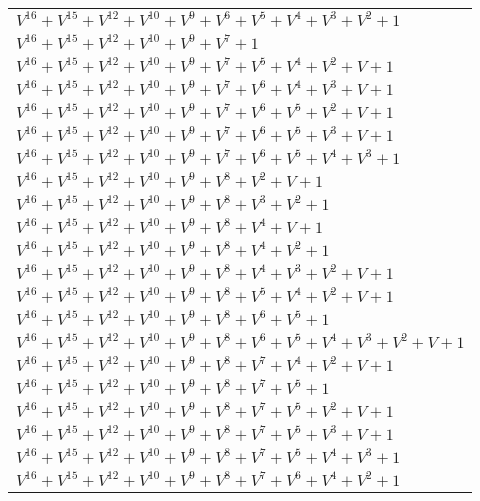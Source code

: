\documentclass[12pt]{article}
\begin{document}
\begin{adjustwidth}{-4cm}{}
\begin{center}
\begin{longtable}{|l|}
$V^{16}  +V^{15}  +V^{12}  +V^{10}  +V^{9}  +V^{6}  +V^{5}  +V^{4}  +V^{3}  +V^{2}  + 1$ \\
$V^{16}  +V^{15}  +V^{12}  +V^{10}  +V^{9}  +V^{7}  + 1$ \\
$V^{16}  +V^{15}  +V^{12}  +V^{10}  +V^{9}  +V^{7}  +V^{5}  +V^{4}  +V^{2}  + V + 1$ \\
$V^{16}  +V^{15}  +V^{12}  +V^{10}  +V^{9}  +V^{7}  +V^{6}  +V^{4}  +V^{3}  + V + 1$ \\
$V^{16}  +V^{15}  +V^{12}  +V^{10}  +V^{9}  +V^{7}  +V^{6}  +V^{5}  +V^{2}  + V + 1$ \\
$V^{16}  +V^{15}  +V^{12}  +V^{10}  +V^{9}  +V^{7}  +V^{6}  +V^{5}  +V^{3}  + V + 1$ \\
$V^{16}  +V^{15}  +V^{12}  +V^{10}  +V^{9}  +V^{7}  +V^{6}  +V^{5}  +V^{4}  +V^{3}  + 1$ \\
$V^{16}  +V^{15}  +V^{12}  +V^{10}  +V^{9}  +V^{8}  +V^{2}  + V + 1$ \\
$V^{16}  +V^{15}  +V^{12}  +V^{10}  +V^{9}  +V^{8}  +V^{3}  +V^{2}  + 1$ \\
$V^{16}  +V^{15}  +V^{12}  +V^{10}  +V^{9}  +V^{8}  +V^{4}  + V + 1$ \\
$V^{16}  +V^{15}  +V^{12}  +V^{10}  +V^{9}  +V^{8}  +V^{4}  +V^{2}  + 1$ \\
$V^{16}  +V^{15}  +V^{12}  +V^{10}  +V^{9}  +V^{8}  +V^{4}  +V^{3}  +V^{2}  + V + 1$ \\
$V^{16}  +V^{15}  +V^{12}  +V^{10}  +V^{9}  +V^{8}  +V^{5}  +V^{4}  +V^{2}  + V + 1$ \\
$V^{16}  +V^{15}  +V^{12}  +V^{10}  +V^{9}  +V^{8}  +V^{6}  +V^{5}  + 1$ \\
$V^{16}  +V^{15}  +V^{12}  +V^{10}  +V^{9}  +V^{8}  +V^{6}  +V^{5}  +V^{4}  +V^{3}  +V^{2}  + V + 1$ \\
$V^{16}  +V^{15}  +V^{12}  +V^{10}  +V^{9}  +V^{8}  +V^{7}  +V^{4}  +V^{2}  + V + 1$ \\
$V^{16}  +V^{15}  +V^{12}  +V^{10}  +V^{9}  +V^{8}  +V^{7}  +V^{5}  + 1$ \\
$V^{16}  +V^{15}  +V^{12}  +V^{10}  +V^{9}  +V^{8}  +V^{7}  +V^{5}  +V^{2}  + V + 1$ \\
$V^{16}  +V^{15}  +V^{12}  +V^{10}  +V^{9}  +V^{8}  +V^{7}  +V^{5}  +V^{3}  + V + 1$ \\
$V^{16}  +V^{15}  +V^{12}  +V^{10}  +V^{9}  +V^{8}  +V^{7}  +V^{5}  +V^{4}  +V^{3}  + 1$ \\
$V^{16}  +V^{15}  +V^{12}  +V^{10}  +V^{9}  +V^{8}  +V^{7}  +V^{6}  +V^{4}  +V^{2}  + 1$ \\

\end{longtable}
\end{center}
\end{adjustwidth}
\end{document}
